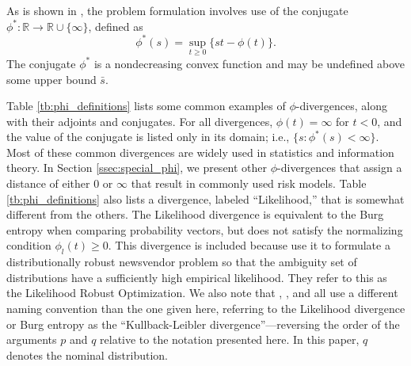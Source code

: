 \documentclass[ijoc,letterpaper]{informs3} %
\newcommand{\R}{{\mathbb{R}}}
\begin{document}
As is shown in \citep{bental2011robust}, the problem formulation involves use of the conjugate $\phi^* : \R \rightarrow \R \cup \{\infty\}$, defined as
\begin{equation} \label{eq:conjugate}
	\phi^*(s) = \sup_{t \geq 0} \{st - \phi(t)\}.
\end{equation}
The conjugate $\phi^*$ is a nondecreasing convex function and may be undefined above some upper bound $\bar{s}$.

Table \ref{tb:phi_definitions} lists some common examples of $\phi$-divergences, along with their adjoints and conjugates.
For all divergences, $\phi(t) = \infty$ for $t < 0$, and the value of the conjugate is listed only in its domain; i.e., $\{s : \phi^*(s) < \infty\}$.
Most of these common divergences are widely used in statistics and information theory.
In Section \ref{ssec:special_phi}, we present other $\phi$-divergences that assign a distance of either $0$ or $\infty$ that result in commonly used risk models.
Table \ref{tb:phi_definitions} also lists a divergence, labeled ``Likelihood,'' that is somewhat different from the others.
The Likelihood divergence is equivalent to the Burg entropy when comparing probability vectors, but does not satisfy the normalizing condition $\phi_l(t) \geq 0$.
This divergence is included because \cite{wang2010likelihood} use it to formulate a distributionally robust newsvendor problem so that the ambiguity set of distributions have a sufficiently high empirical likelihood. 
They refer to this as the Likelihood Robust Optimization. 
We also note that \cite{calafiore2007ambiguous}, \cite{hukullback}, and \cite{wang2010likelihood} all use a different naming convention than the one given here, referring to the Likelihood divergence or Burg entropy as the ``Kullback-Leibler divergence''---reversing the order of the arguments $p$ and $q$ relative to the notation presented here.
In this paper, $q$ denotes the nominal distribution. 
\end{document}
